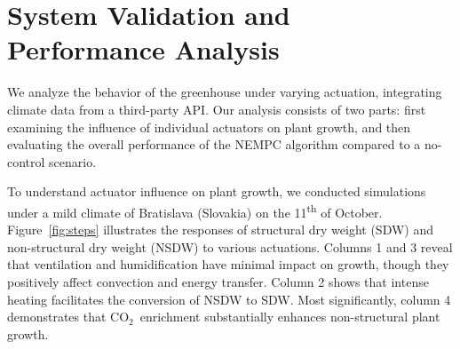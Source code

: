 \documentclass[conference]{IEEEtran}
\newcommand{\coo}{\ensuremath{\mathrm{CO_2}}}
\begin{document}
\section{System Validation and Performance Analysis}
We analyze the behavior of the greenhouse under varying actuation, integrating climate data from a third-party API\@. Our analysis consists of two parts: first examining the influence of individual actuators on plant growth, and then evaluating the overall performance of the NEMPC algorithm compared to a no-control scenario.

To understand actuator influence on plant growth, we conducted simulations under a mild climate of Bratislava (Slovakia) on the 11\textsuperscript{th} of October. Figure~\ref{fig:steps} illustrates the responses of structural dry weight (SDW) and non-structural dry weight (NSDW) to various actuations. Columns 1 and 3 reveal that ventilation and humidification have minimal impact on growth, though they positively affect convection and energy transfer. Column 2 shows that intense heating facilitates the conversion of NSDW to SDW\@. Most significantly, column 4 demonstrates that \coo\ enrichment substantially enhances non-structural plant growth.
\end{document}
